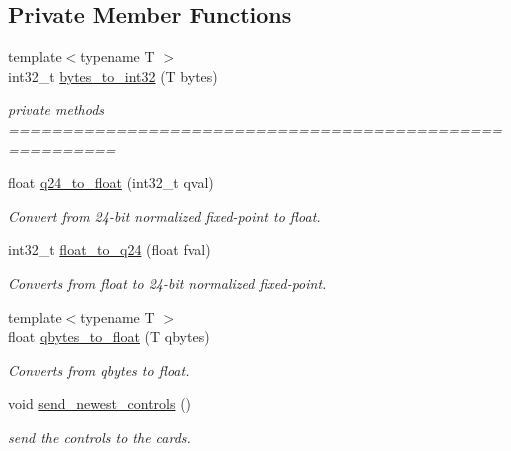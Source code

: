 \subsection*{Private Member Functions}
\begin{DoxyCompactItemize}
\item 
{\footnotesize template$<$typename T $>$ }\\int32\+\_\+t \hyperlink{classblmc__drivers_1_1CanBusMotorBoard_ae320518f2cf2c8af0e50220f11556b85}{bytes\+\_\+to\+\_\+int32} (T bytes)
\begin{DoxyCompactList}\small\item\em private methods ======================================================== \end{DoxyCompactList}\item 
float \hyperlink{classblmc__drivers_1_1CanBusMotorBoard_a05db7868ff7034289358cdb774b59720}{q24\+\_\+to\+\_\+float} (int32\+\_\+t qval)
\begin{DoxyCompactList}\small\item\em Convert from 24-\/bit normalized fixed-\/point to float. \end{DoxyCompactList}\item 
int32\+\_\+t \hyperlink{classblmc__drivers_1_1CanBusMotorBoard_ad6d91ccf867e9a3996492cce33270426}{float\+\_\+to\+\_\+q24} (float fval)
\begin{DoxyCompactList}\small\item\em Converts from float to 24-\/bit normalized fixed-\/point. \end{DoxyCompactList}\item 
{\footnotesize template$<$typename T $>$ }\\float \hyperlink{classblmc__drivers_1_1CanBusMotorBoard_ad2cee731d455d64d71014c9821219410}{qbytes\+\_\+to\+\_\+float} (T qbytes)
\begin{DoxyCompactList}\small\item\em Converts from qbytes to float. \end{DoxyCompactList}\item 
void \hyperlink{classblmc__drivers_1_1CanBusMotorBoard_a5ec842674fd543a8c834265433740387}{send\+\_\+newest\+\_\+controls} ()
\begin{DoxyCompactList}\small\item\em send the controls to the cards. \end{DoxyCompactList}\item 
\mbox{\label{classblmc__drivers_1_1CanBusMotorBoard_a9f74868318daf4a97a5266e4d8d6f556}} 

\end{DoxyCompactItemize}
